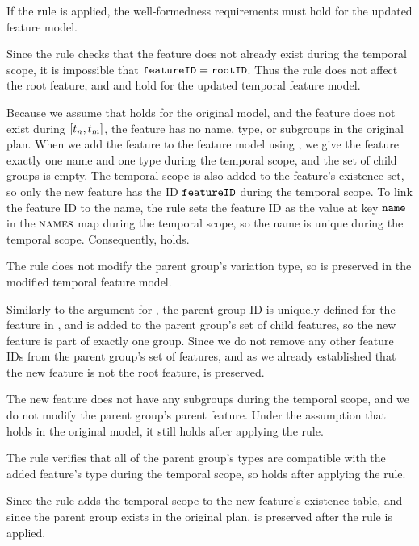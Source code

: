If the rule is applied, the well-formedness requirements must hold for the updated feature model. 

Since the rule checks that the feature does not already exist during the temporal scope, it is impossible that $\texttt{featureID} = \texttt{rootID}$. Thus the rule does not affect the root feature, and  and  hold for the updated temporal feature model.

Because we assume that  holds for the original model, and the feature does not exist during $\interval{t_n}{t_m}$, the feature has no name, type, or subgroups in the original plan. When we add the feature to the feature model using , we give the feature exactly one name and one type during the temporal scope, and the set of child groups is empty. The temporal scope is also added to the feature's existence set, so only the new feature has the ID $\texttt{featureID}$ during the temporal scope. To link the feature ID to the name, the rule sets the feature ID as the value at key $\texttt{name}$ in the $\textsc{names}{}$ map during the temporal scope, so the name is unique during the temporal scope.
Consequently,  holds.

The rule does not modify the parent group's variation type, so  is preserved in the modified temporal feature model.

Similarly to the argument for , the parent group ID is uniquely defined for the feature in , and  is added to the parent group's set of child features, so the new feature is part of exactly one group. Since we do not remove any other feature IDs from the parent group's set of features, and as we already established that the new feature is not the root feature,  is preserved.

The new feature does not have any subgroups during the temporal scope, and we do not modify the parent group's parent feature. Under the assumption that  holds in the original model, it still holds after applying the  rule.

The rule verifies that all of the parent group's types are compatible with the added feature's type during the temporal scope, so  holds after applying the rule.

Since the rule adds the temporal scope to the new feature's existence table, and since the parent group exists in the original plan,  is preserved after the rule is applied.

